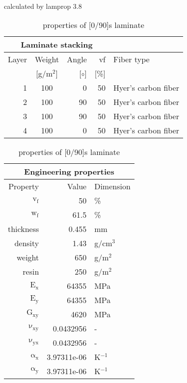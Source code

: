 \begin{table}[!htbp]
  \renewcommand{\arraystretch}{1.2}
  \caption{\label{tab:[0/90]s laminate}properties of [0/90]s laminate}
  \centering\footnotesize{\rule{0pt}{10pt}
  \tiny calculated by lamprop 3.8\\[3pt]}
    \begin{tabular}[t]{rcrrl}
      \multicolumn{4}{c}{\small\textbf{Laminate stacking}}\\[0.1em]
      \toprule %
      Layer & Weight & Angle & vf & Fiber type\\
            & [g/m$^2$] & [$\circ$] & [\%]\\
      \midrule
      1 &  100 &     0 & 50 & Hyer's carbon fiber\\
      2 &  100 &    90 & 50 & Hyer's carbon fiber\\
      3 &  100 &    90 & 50 & Hyer's carbon fiber\\
      4 &  100 &     0 & 50 & Hyer's carbon fiber\\
      \bottomrule
    \end{tabular}\hspace{0.02\textwidth}
    \begin{tabular}[t]{rrl}
      \multicolumn{3}{c}{\small\textbf{Engineering properties}}\\[0.1em]
      \toprule
      Property & Value & Dimension\\
      \midrule
      $\mathrm{v_f}$ & 50 &\%\\
      $\mathrm{w_f}$ & 61.5 &\%\\
      thickness & 0.455 & mm\\
      density & 1.43 & g/cm$^3$\\
      weight & 650 & g/m$^2$\\
      resin & 250 & g/m$^2$\\
      \midrule
      $\mathrm{E_x}$ &    64355 & MPa\\
      $\mathrm{E_y}$ &    64355 & MPa\\
      $\mathrm{G_{xy}}$ &     4620 & MPa\\
      $\mathrm{\nu_{xy}}$ & 0.0432956 &-\\
      $\mathrm{\nu_{yx}}$ & 0.0432956 &-\\
      $\mathrm{\alpha_x}$ & 3.97311e-06 & K$^{-1}$\\
      $\mathrm{\alpha_y}$ & 3.97311e-06 & K$^{-1}$\\
      \bottomrule
    \end{tabular}

\end{table}
